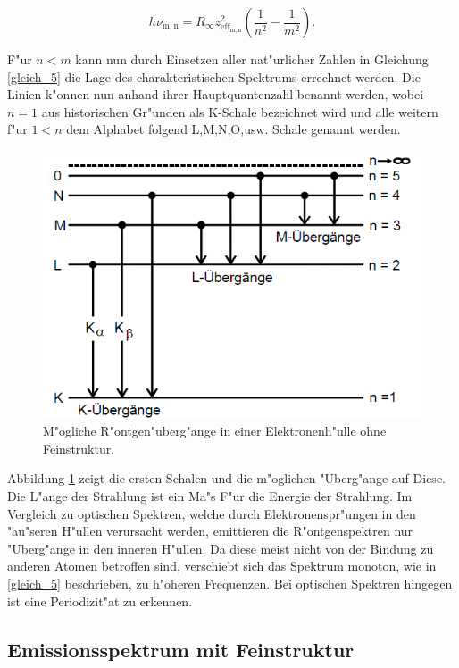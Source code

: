 		\begin{equation}
			h \nu_\mathrm{m,n} = R_\infty z_{\mathrm{eff}_\mathrm{m,n}}^2 \left( \frac{1}{n^2} - \frac{1}{m^2} \right). \label{gleich_5}
		\end{equation}

		F"ur $n < m$ kann nun durch Einsetzen aller nat"urlicher Zahlen in Gleichung \ref{gleich_5} die Lage des charakteristischen Spektrums errechnet werden.
		Die Linien k"onnen nun anhand ihrer Hauptquantenzahl benannt werden, wobei $n = 1$ aus historischen Gr"unden als K-Schale bezeichnet wird und alle weitern f"ur $1 < n$ dem Alphabet folgend L,M,N,O,usw. Schale genannt werden. 

		\begin{figure}[htbp]
			\centering
			\includegraphics[width = 12cm]{img/Roentgenuebergaenge.png}
			\caption{M"ogliche R"ontgen"uberg"ange in einer Elektronenh"ulle ohne Feinstruktur.}
			\label{roentgenuebergaenge}
		\end{figure}

		Abbildung \ref{roentgenuebergaenge} zeigt die ersten Schalen und die m"oglichen "Uberg"ange auf Diese. Die L"ange der Strahlung ist ein Ma"s F"ur die Energie der Strahlung.
		Im Vergleich zu optischen Spektren, welche durch Elektronenspr"ungen in den "au"seren H"ullen verursacht werden, emittieren die R"ontgenspektren nur "Uberg"ange in den inneren H"ullen.
		Da diese meist nicht von der Bindung zu anderen Atomen betroffen sind, verschiebt sich das Spektrum monoton, wie in \ref{gleich_5} beschrieben, zu h"oheren Frequenzen.
		Bei optischen Spektren hingegen ist eine Periodizit"at zu erkennen.

	\subsection{Emissionsspektrum mit Feinstruktur}
	\label{sub:emissionsspektrum_mit_feinstruktur}
	
